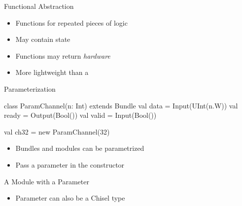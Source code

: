 \begin{frame}[fragile]{Functional Abstraction}
\begin{itemize}
\item Functions for repeated pieces of logic
\item May contain state
\item Functions may return \emph{hardware}
\item More lightweight than a 
\end{itemize}
\end{frame}


\begin{frame}[fragile]{Parameterization}
\begin{chisel}
class ParamChannel(n: Int) extends Bundle {
  val data = Input(UInt(n.W))
  val ready = Output(Bool())
  val valid = Input(Bool())
}

val ch32 = new ParamChannel(32)
\end{chisel}
\begin{itemize}
\item Bundles and modules can be parametrized
\item Pass a parameter in the constructor
\end{itemize}

\end{frame}
\begin{frame}[fragile]{A Module with a Parameter}
\begin{itemize}
\item Parameter can also be a Chisel type
\end{itemize}
\end{frame}

